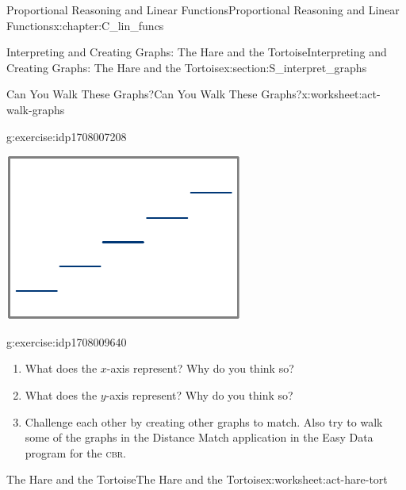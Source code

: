 \documentclass[oneside,10pt,]{book}
\newcommand{\initialism}[1]{\textsc{\MakeLowercase{#1}}}
\numberwithin{equation}{chapter}
\begin{document}
\begin{chapterptx}{Proportional Reasoning and Linear Functions}{}{Proportional Reasoning and Linear Functions}{}{}{x:chapter:C_lin_funcs}
\begin{sectionptx}{Interpreting and Creating Graphs: The Hare and the Tortoise}{}{Interpreting and Creating Graphs: The Hare and the Tortoise}{}{}{x:section:S_interpret_graphs}
\begin{worksheet-subsection}{Can You Walk These Graphs?}{}{Can You Walk These Graphs?}{}{}{x:worksheet:act-walk-graphs}
\begin{divisionexercise}{1}{}{}{g:exercise:idp1708007208}
\begin{enumerate}[font=\bfseries,label=(\alph*),ref=\alph*]
\begin{image}{0.325}{0.35}{0.325}
\includegraphics[width=\linewidth]{external/walk-graphs-8.pdf}
\end{image}%
%
\end{enumerate}
\end{divisionexercise}%
\begin{divisionexercise}{2}{}{}{g:exercise:idp1708009640}%
\begin{enumerate}[font=\bfseries,label=(\alph*),ref=\alph*]
\item{}What does the \(x\)-axis represent? Why do you think so?%
\item{}What does the \(y\)-axis represent? Why do you think so?%
\item{}Challenge each other by creating other graphs to match. Also try to walk some of the graphs in the Distance Match application in the Easy Data program for the \initialism{CBR}.%
\end{enumerate}
\end{divisionexercise}%
\end{worksheet-subsection}
\restoregeometry
%
%
\typeout{************************************************}
\typeout{************************************************}
%
\begin{worksheet-subsection}{The Hare and the Tortoise}{}{The Hare and the Tortoise}{}{}{x:worksheet:act-hare-tort}
\begin{introduction}{}%

\end{introduction}
\end{worksheet-subsection}
\end{sectionptx}
\end{chapterptx}
\end{document}
